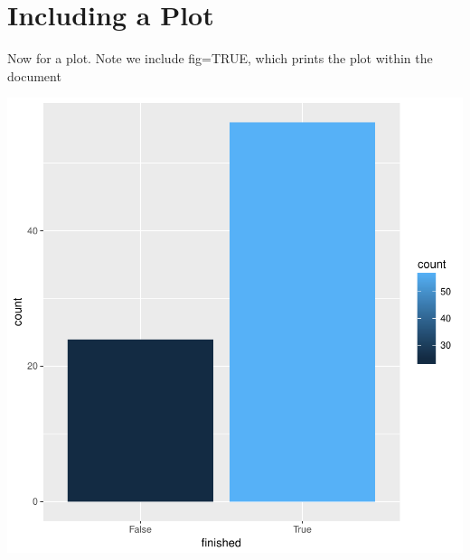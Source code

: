 \documentclass{article}
\begin{document}


\section{Including a Plot}
Now for a plot.  Note we include fig=TRUE, which prints the plot within the document


\includegraphics{summary-figure_one}
\end{document}
